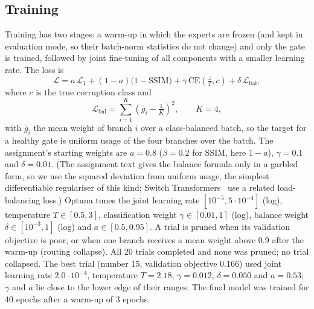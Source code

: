 \documentclass[conference]{IEEEtran}
\newcommand{\Ltwo}{\ensuremath{\mathcal{L}}}
\begin{document}
\subsection{Training}
Training has two stages: a warm-up in which the experts are frozen (and kept in evaluation mode, so their batch-norm statistics do not change) and only the gate is trained, followed by joint fine-tuning of all components with a smaller learning rate. The loss is
\begin{equation}
\Ltwo = a\,\Ltwo_1+(1-a)\bigl(1-\mathrm{SSIM}\bigr)+\gamma\,\mathrm{CE}\!\left(\tfrac{z}{T},c\right)+\delta\,\Ltwo_{\mathrm{bal}},
\end{equation}
where $c$ is the true corruption class and
\begin{equation}
\Ltwo_{\mathrm{bal}}=\sum_{i=1}^{K}\left(\bar{g}_i-\tfrac{1}{K}\right)^2,\qquad K=4,
\end{equation}
with $\bar{g}_i$ the mean weight of branch $i$ over a class-balanced batch, so the target for a healthy gate is uniform usage of the four branches over the batch. The assignment's starting weights are $a=0.8$ ($\beta=0.2$ for SSIM, here $1-a$), $\gamma=0.1$ and $\delta=0.01$.
(The assignment text gives the balance formula only in a garbled form, so we use the squared deviation from uniform usage, the simplest differentiable regulariser of this kind; Switch Transformers~\cite{fedus2022} use a related load-balancing loss.)
Optuna tunes the joint learning rate $[10^{-5},5\cdot10^{-4}]$ (log), temperature $T\in[0.5,3]$, classification weight $\gamma\in[0.01,1]$ (log), balance weight $\delta\in[10^{-3},1]$ (log) and $a\in[0.5,0.95]$.
A trial is pruned when its validation objective is poor, or when one branch receives a mean weight above 0.9 after the warm-up (routing collapse). All 20 trials completed and none was pruned; no trial collapsed. The best trial (number 15, validation objective 0.166) used joint learning rate $2.0\cdot10^{-4}$, temperature $T=2.18$, $\gamma=0.012$, $\delta=0.050$ and $a=0.53$; $\gamma$ and $a$ lie close to the lower edge of their ranges. The final model was trained for 40 epochs after a warm-up of 3 epochs.
\end{document}
